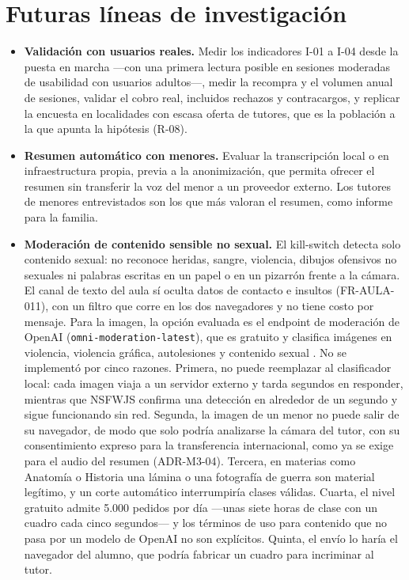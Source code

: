 \section{Futuras líneas de investigación}\label{sec:futuras-lineas}

\begin{itemize}
    \item \textbf{Validación con usuarios reales.} Medir los indicadores
          I-01 a I-04 desde la puesta en marcha ---con una primera lectura
          posible en sesiones moderadas de usabilidad con usuarios
          adultos---, medir la recompra y el volumen anual de sesiones,
          validar el cobro real, incluidos rechazos y contracargos, y
          replicar la encuesta en localidades con escasa oferta de tutores,
          que es la población a la que apunta la hipótesis (R-08).
    \item \textbf{Resumen automático con menores.} Evaluar la
          transcripción local o en infraestructura propia, previa a la
          anonimización, que permita ofrecer el resumen sin transferir la
          voz del menor a un proveedor externo. Los tutores de menores
          entrevistados son los que más valoran el resumen, como informe
          para la familia.
    \item \textbf{Moderación de contenido sensible no sexual.} El
          kill-switch detecta solo contenido sexual: no reconoce heridas,
          sangre, violencia, dibujos ofensivos no sexuales ni palabras
          escritas en un papel o en un pizarrón frente a la cámara. El
          canal de texto del aula sí oculta datos de contacto e insultos
          (FR-AULA-011), con un filtro que corre en los dos navegadores y
          no tiene costo por mensaje. Para la imagen, la opción evaluada es
          el endpoint de moderación de OpenAI
          (\texttt{omni-moderation-latest}), que es gratuito y clasifica
          imágenes en violencia, violencia gráfica, autolesiones y
          contenido sexual \citep{openaimoderacion2026}. No se implementó
          por cinco razones. Primera, no puede reemplazar al clasificador
          local: cada imagen viaja a un servidor externo y tarda segundos
          en responder, mientras que NSFWJS confirma una detección en
          alrededor de un segundo y sigue funcionando sin red. Segunda, la
          imagen de un menor no puede salir de su navegador, de modo que
          solo podría analizarse la cámara del tutor, con su
          consentimiento expreso para la transferencia internacional,
          como ya se exige para el audio del resumen (ADR-M3-04). Tercera,
          en materias como Anatomía o Historia una lámina o una fotografía
          de guerra son material legítimo, y un corte automático
          interrumpiría clases válidas. Cuarta, el nivel gratuito admite
          5.000 pedidos por día ---unas siete horas de clase con un cuadro
          cada cinco segundos--- y los términos de uso para contenido que
          no pasa por un modelo de OpenAI no son explícitos. Quinta, el
          envío lo haría el navegador del alumno, que podría fabricar un
          cuadro para incriminar al tutor.


\end{itemize}

